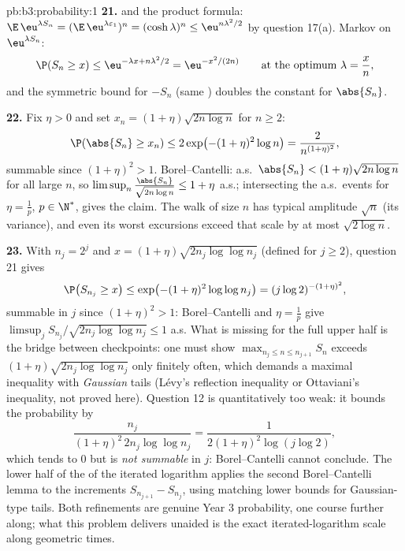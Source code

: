 \begin{solution}{pb:b3:probability:1}
\textbf{21.}  and the product formula:
$\E\,\eu^{\lambda S_n} = (\E\,\eu^{\lambda\varepsilon_1})^n
= (\cosh\lambda)^n \leq \eu^{n\lambda^2/2}$ by question
17(a). Markov on $\eu^{\lambda S_n}$:
\[
\P(S_n \geq x) \leq \eu^{-\lambda x + n\lambda^2/2}
= \eu^{-x^2/(2n)}
\qquad\text{at the optimum } \lambda = \frac xn,
\]
and the symmetric bound for $-S_n$ (same ) doubles the
constant for $\abs{S_n}$.

\textbf{22.} Fix $\eta > 0$ and set $x_n = (1 +
\eta)\sqrt{2n\log n}$ for $n \geq 2$:
\[
\P(\abs{S_n} \geq x_n) \leq 2\exp\bigl(-(1 +
\eta)^2\log n\bigr) = \frac{2}{n^{(1+\eta)^2}},
\]
summable since $(1 + \eta)^2 > 1$. Borel--Cantelli: a.s.\
$\abs{S_n} < (1 + \eta)\sqrt{2n\log n}$ for all large $n$,
so $\limsup_n\frac{\abs{S_n}}{\sqrt{2n\log n}} \leq 1 +
\eta$ a.s.; intersecting the a.s.\ events for $\eta =
\frac1p$, $p \in \N^*$, gives the claim. The walk of size
$n$ has typical amplitude $\sqrt n$ (its variance), and
even its worst excursions exceed that scale by at most
$\sqrt{2\log n}$.

\textbf{23.} With $n_j = 2^j$ and $x = (1 +
\eta)\sqrt{2n_j\log\log n_j}$ (defined for $j \geq 2$),
question 21 gives
\[
\P\bigl(S_{n_j} \geq x\bigr) \leq \exp\bigl(-(1 +
\eta)^2\log\log n_j\bigr) = (j\log 2)^{-(1+\eta)^2},
\]
summable in $j$ since $(1 + \eta)^2 > 1$: Borel--Cantelli
and $\eta = \frac1p$ give $\limsup_jS_{n_j}/\sqrt{2n_j
\log\log n_j} \leq 1$ a.s. What is missing for the full
upper half is the bridge between checkpoints: one must
show $\max_{n_j\leq n\leq n_{j+1}}S_n$ exceeds
$(1+\eta)\sqrt{2n_j\log\log n_j}$ only finitely often,
which demands a maximal inequality with \emph{Gaussian}
tails (L\'evy's reflection inequality or Ottaviani's
inequality, not proved here). Question 12 is quantitatively
too weak: it bounds the probability by
\[
\frac{n_j}{(1+\eta)^2\,2n_j\log\log n_j}
= \frac{1}{2(1+\eta)^2\log(j\log2)},
\]
which tends to $0$ but is \emph{not summable} in $j$:
Borel--Cantelli cannot conclude. The lower half of the 
of the iterated logarithm applies the second
Borel--Cantelli lemma to the  increments
$S_{n_{j+1}} - S_{n_j}$, using matching lower bounds for
Gaussian-type tails. Both refinements are genuine Year 3
probability, one course further along; what this problem
delivers unaided is the exact iterated-logarithm scale
along geometric times.


\end{solution}
